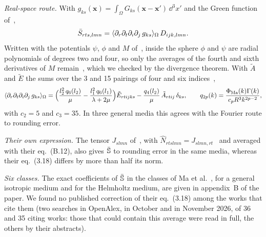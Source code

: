 \emph{Real-space route.} With $g_{ks}(\bm x)=\int_\Omega G_{ks}(\bm x-\bm x')\,\dd^3x'$ and
the Green function of~\cite[eqs.~(2.16)--(2.18)]{Ma2018},
\begin{equation}
\bar S_{rts,lmn}=\langle \partial_r\partial_t\partial_i\partial_j\,g_{ks}\rangle_\Omega\,D_{ijk,lmn}.
\end{equation}
Written with the potentials $\psi$, $\phi$ and $M$ of~\cite[eq.~(3.13)]{Ma2018}, inside the
sphere $\phi$ and $\psi$ are radial polynomials of degrees two and four, so only the averages
of the fourth and sixth derivatives of $M$ remain~\cite[eq.~(B.12)]{Ma2018}, which we checked by
the divergence theorem. With $\tilde A$ and $\tilde E$ the sums over the 3 and 15 pairings of
four and six indices~\cite[eq.~(B.11)]{Ma2018},
\begin{equation}
\langle \partial_r\partial_t\partial_i\partial_j\,g_{ks}\rangle_\Omega
=\Big(\frac{l_2^2\,q_6(l_2)}{\mu}-\frac{l_1^2\,q_6(l_1)}{\lambda+2\mu}\Big)\tilde E_{rtijks}
-\frac{q_4(l_2)}{\mu}\,\tilde A_{rtij}\,\delta_{ks},\qquad
q_{2p}(k)=\frac{\Phi_{\mathrm{Ma}}(k)\Gamma(k)}{c_pR^3k^{2p-2}},
\end{equation}
with $c_2=5$ and $c_3=35$. In three general media this agrees with the Fourier route to
rounding error.

\emph{Their own expression.} The tensor $J_{slmn}$ of~\cite[eq.~(3.12)]{Ma2018}, with
$\hat N_{rtslmn}=J_{slmn,rt}$~\cite[eq.~(3.10)]{Ma2018} and averaged with their eq.~(B.12),
also gives $\bar{\mathbb{S}}$ to rounding error in the same media, whereas their eq.~(3.18) differs by
more than half its norm.

\emph{Six classes.} The exact coefficients of $\bar{\mathbb{S}}$ in the classes of
Ma et al.~\cite[eq.~(3.18)]{Ma2018}, for a general isotropic medium and for the Helmholtz
medium, are given in appendix~B of the paper. We found no published correction of their
eq.~(3.18) among the works that cite them (two searches in OpenAlex, in October and in
November 2026, of 36 and 35 citing works: those that could contain this average were read
in full, the others by their abstracts).
